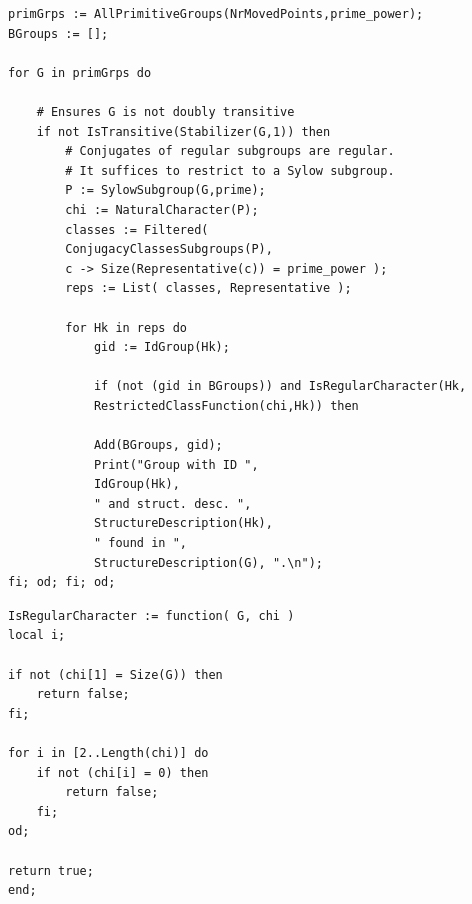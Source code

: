 \documentclass[12pt]{amsart}
\theoremstyle{definition}
\begin{document}
\begin{lstlisting}[caption={This is a GAP script which searches among the uniprimitive groups of degree ``prime\_power'' for non-B-groups of prime power order. A subgroup is tested for regularity by determining whether the permutation character of the primitive group restricts to the regular character of that subgroup. See Listing 2 below for the function definition of ``IsRegularCharacter.''}, label={lst:gap_ids}]
primGrps := AllPrimitiveGroups(NrMovedPoints,prime_power);
BGroups := [];
		
for G in primGrps do
		
	# Ensures G is not doubly transitive
	if not IsTransitive(Stabilizer(G,1)) then
	 	# Conjugates of regular subgroups are regular.
		# It suffices to restrict to a Sylow subgroup.
		P := SylowSubgroup(G,prime);
		chi := NaturalCharacter(P);	
		classes := Filtered(
		ConjugacyClassesSubgroups(P), 
		c -> Size(Representative(c)) = prime_power );
		reps := List( classes, Representative );
			
		for Hk in reps do
			gid := IdGroup(Hk);
			
			if (not (gid in BGroups)) and IsRegularCharacter(Hk, 	
			RestrictedClassFunction(chi,Hk)) then
			
			Add(BGroups, gid);
			Print("Group with ID ", 
			IdGroup(Hk), 
			" and struct. desc. ", 
			StructureDescription(Hk), 
			" found in ", 	
			StructureDescription(G), ".\n");
fi; od; fi; od;
\end{lstlisting}

\begin{lstlisting}[caption={This is a GAP function definition which determines whether a character ``chi'' of the group ``G'' is the regular character. This is used in the code of Listing 2 to test the regularity of a permutation group.}]
IsRegularCharacter := function( G, chi )
local i;

if not (chi[1] = Size(G)) then
	return false;
fi;

for i in [2..Length(chi)] do
	if not (chi[i] = 0) then
		return false;
	fi;
od;

return true;
end;
\end{lstlisting}
	
	
\end{document}
